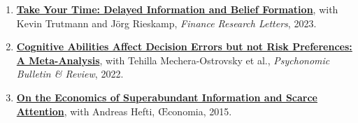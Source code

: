 \documentclass[10pt]{article}
\begin{document}
\begin{enumerate}
\item[3.] \href{https://www.sciencedirect.com/science/article/pii/S1544612322006195}{\textbf{Take Your Time: Delayed Information and Belief Formation}}, with Kevin Trutmann and J\"{o}rg
Rieskamp, \textit{Finance Research Letters}, 2023.

\item[2.] \href{https://link.springer.com/article/10.3758/s13423-021-02053-1}{\textbf{Cognitive Abilities Affect Decision Errors but not Risk Preferences: A Meta-Analysis}}, with
Tehilla Mechera-Ostrovsky et al., \textit{Psychonomic Bulletin \& Review}, 2022.

\item[1.] \href{https://journals.openedition.org/oeconomia/1104}{\textbf{On the Economics of Superabundant Information and Scarce Attention}}, with Andreas Hefti,
{\OE}conomia, 2015.
\end{enumerate}
\end{document}
